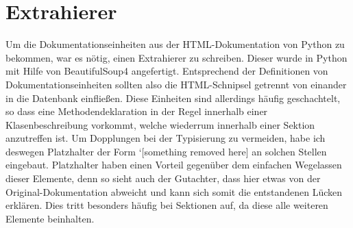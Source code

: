 \section{Extrahierer}

Um die Dokumentationseinheiten aus der HTML-Dokumentation von Python zu bekommen, war es nötig, einen Extrahierer zu schreiben. Dieser wurde in Python mit Hilfe von BeautifulSoup4 angefertigt. Entsprechend der Definitionen von Dokumentationseinheiten sollten also die HTML-Schnipsel getrennt von einander in die Datenbank einfließen. Diese Einheiten sind allerdings häufig geschachtelt, so dass eine Methodendeklaration in der Regel innerhalb einer Klasenbeschreibung vorkommt, welche wiederrum innerhalb einer Sektion anzutreffen ist. Um Dopplungen bei der Typisierung zu vermeiden, habe ich deswegen Platzhalter der Form `[something removed here] an solchen Stellen eingebaut. Platzhalter haben einen Vorteil gegenüber dem einfachen Wegelassen dieser Elemente, denn so sieht auch der Gutachter, dass hier etwas von der Original-Dokumentation abweicht und kann sich somit die entstandenen Lücken erklären. Dies tritt besonders häufig bei Sektionen auf, da diese alle weiteren Elemente beinhalten. 
